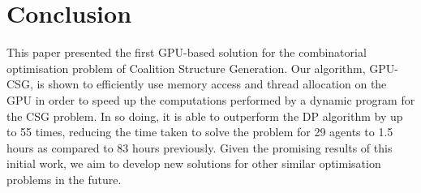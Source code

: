 \documentclass{llncs}
\begin{document}
\section{Conclusion}
This paper presented the first GPU-based solution for the combinatorial optimisation problem of Coalition Structure Generation. Our algorithm, GPU-CSG, is shown to efficiently use memory access and thread allocation on the GPU in order to speed up the computations performed by a dynamic program for the CSG problem. In so doing, it is able to outperform the DP algorithm by up to 55 times, reducing the time taken to solve the problem for 29 agents to 1.5 hours as compared to 83 hours previously. Given the promising results of this initial work, we aim to develop new solutions for other similar optimisation problems in the future.

\end{document}
